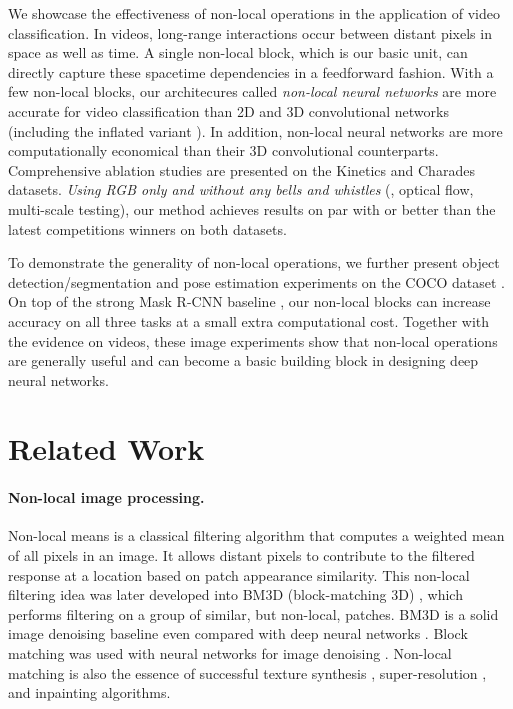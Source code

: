 \documentclass[10pt,twocolumn,letterpaper]{article}
\begin{document}
We showcase the effectiveness of non-local operations in the application of video classification. In videos, long-range interactions occur between distant pixels in space as well as time. A single non-local block, which is our basic unit, can directly capture these spacetime dependencies in a feedforward fashion. With a few non-local blocks, our architecures called \emph{non-local neural networks} are more accurate for video classification than 2D and 3D convolutional networks \cite{Tran2015} (including the inflated variant \cite{Carreira2017}). In addition, non-local neural networks are more computationally economical than their 3D convolutional counterparts. Comprehensive ablation studies are presented on the Kinetics \cite{Kay2017} and Charades \cite{Sigurdsson2016} datasets. \emph{Using RGB only and without any bells and whistles} (\eg, optical flow, multi-scale testing), our method achieves results on par with or better than the latest competitions winners on both datasets.

To demonstrate the generality of non-local operations, we further present object detection/segmentation and pose estimation experiments on the COCO dataset \cite{Lin2014}. On top of the strong Mask R-CNN baseline \cite{He2017}, our non-local blocks can increase accuracy on all three tasks at a small extra computational cost.
Together with the evidence on videos, these image experiments show that non-local operations are generally useful and can become a basic building block in designing deep neural networks.

\vspace{-.2em}
\section{Related Work}
\vspace{-.2em}

\paragraph{Non-local image processing.} Non-local means \cite{Buades2005} is a classical filtering algorithm that computes a weighted mean of all pixels in an image. It allows distant pixels to contribute to the filtered response at a location based on patch appearance similarity. This non-local filtering idea was later developed into BM3D (block-matching 3D) \cite{Dabov2007}, which performs filtering on a group of similar, but non-local, patches. BM3D is a solid image denoising baseline even compared with deep neural networks \cite{Burger2012}. Block matching was used with neural networks for image denoising \cite{Burger2012a,Lefkimmiatis2016}.
Non-local matching is also the essence of successful texture synthesis \cite{Efros1999}, super-resolution \cite{Glasner2009}, and inpainting \cite{Barnes2009} algorithms. 
\end{document}
